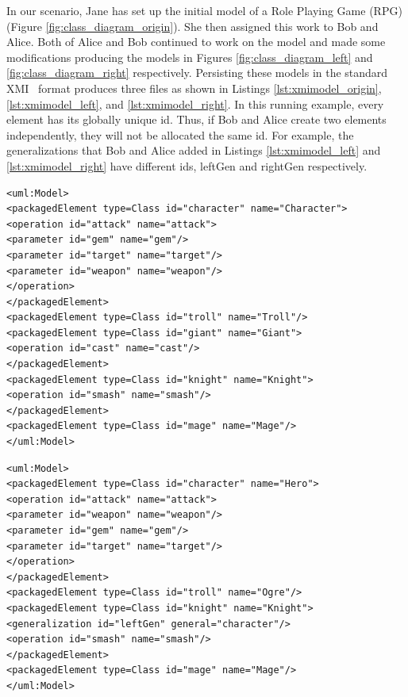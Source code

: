 In our scenario, Jane has set up the initial model of a Role Playing Game (RPG) (Figure \ref{fig:class_diagram_origin}). She then assigned this work to Bob and Alice. Both of Alice and Bob continued to work on the model and made some modifications producing the models in Figures \ref{fig:class_diagram_left} and \ref{fig:class_diagram_right} respectively. Persisting these models in the standard XMI~\cite{omg2018xmi} format produces three files as shown in Listings \ref{lst:xmimodel_origin}, \ref{lst:xmimodel_left}, and \ref{lst:xmimodel_right}. In this running example, every element has its globally unique id. Thus, if Bob and Alice create two elements independently, they will not be allocated the same id. For example, the generalizations that Bob and Alice added in Listings \ref{lst:xmimodel_left} and \ref{lst:xmimodel_right} have different ids, \textsf{leftGen} and \textsf{rightGen} respectively.  
\begin{lstlisting}[style=xmi,caption={Simplified XMI file of the original version in Figure \ref{fig:class_diagram_origin}.},label=lst:xmimodel_origin]
<uml:Model>
<packagedElement type=Class id="character" name="Character">
<operation id="attack" name="attack">
<parameter id="gem" name="gem"/>
<parameter id="target" name="target"/>
<parameter id="weapon" name="weapon"/>
</operation>
</packagedElement>
<packagedElement type=Class id="troll" name="Troll"/>
<packagedElement type=Class id="giant" name="Giant">
<operation id="cast" name="cast"/>
</packagedElement>
<packagedElement type=Class id="knight" name="Knight">
<operation id="smash" name="smash"/>
</packagedElement>
<packagedElement type=Class id="mage" name="Mage"/>
</uml:Model>
\end{lstlisting}

\begin{lstlisting}[style=xmi,caption={Simplified XMI file of the left version in Figure \ref{fig:class_diagram_left}.},label=lst:xmimodel_left]
<uml:Model>
<packagedElement type=Class id="character" name="Hero">
<operation id="attack" name="attack">
<parameter id="weapon" name="weapon"/>
<parameter id="gem" name="gem"/>
<parameter id="target" name="target"/>
</operation>  
</packagedElement>
<packagedElement type=Class id="troll" name="Ogre"/>
<packagedElement type=Class id="knight" name="Knight">
<generalization id="leftGen" general="character"/>
<operation id="smash" name="smash"/>
</packagedElement>
<packagedElement type=Class id="mage" name="Mage"/>
</uml:Model>
\end{lstlisting}

